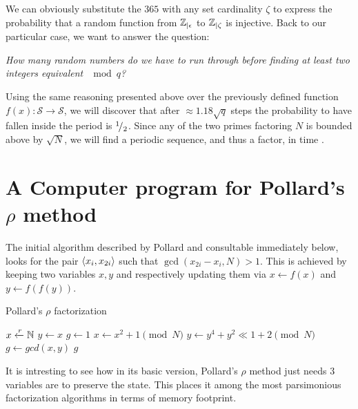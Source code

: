 We can obviously substitute the $365$ with any set cardinality $\zeta$
to express the probability that a random function from $\mathbb{Z}_{|\epsilon}$
to $\mathbb{Z}_{|\zeta}$ is injective. Back to our particular case,
we want to answer the question:

\emph{
  How many random numbers do we have to run through before finding at least
  two integers equivalent $\mod{q}$?
}


Using the same reasoning presented above over the previously defined function
$f(x): \mathcal{S} \to \mathcal{S}$, we will discover that after
$\approx 1.18 \sqrt{q}$ steps the probability to have fallen inside the period
is ${}^{1}\!/_{2}$. %
Since any of the two primes factoring $N$ is bounded above by $\sqrt{N}$, we
will find a periodic sequence, and thus a factor, in time .


\section{A Computer program for Pollard's $\rho$ method}

The initial algorithm described by Pollard \cite{pollardMC} and consultable
immediately below, looks for the pair $\langle x_i, x_{2i}\rangle$ such that
$\gcd(x_{2i} - x_i, N) > 1$.  This is achieved by keeping two variables $x, y$
and respectively updating them via $x \gets f(x)$ and $y \gets f(f(y))$.

\begin{algorithm}
  \caption{Pollard's $\rho$ factorization}
  \begin{algorithmic}[1]
    \State $x \xleftarrow{r} \mathbb{N}$
    \State $y \gets x$
    \State $g \gets 1$
      \State $x \gets x^2 + 1 \pmod{N}$
      \State $y \gets y^4 + y^2 \ll 1 + 2 \pmod{N}$
      \State $g \gets gcd(x, y)$
    \EndWhile
    \Return $g$
  \end{algorithmic}
\end{algorithm}

\begin{remark}
  It is intresting to see how in its basic version, Pollard's $\rho$
  method just needs 3 variables are to preserve the
  state. This places it among the most parsimonious factorization algorithms in
  terms of memory footprint.
\end{remark}

